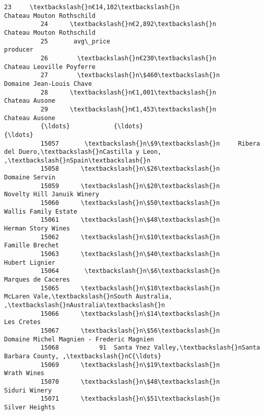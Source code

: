 \documentclass[11pt]{article}
\begin{document}
\begin{Verbatim}[commandchars=\\\{\}]
          23     \textbackslash{}n€14,102\textbackslash{}n                          Chateau Mouton Rothschild   
          24      \textbackslash{}n€2,892\textbackslash{}n                          Chateau Mouton Rothschild   
          25       avg\_price                                           producer   
          26        \textbackslash{}n€230\textbackslash{}n                          Chateau Leoville Poyferre   
          27        \textbackslash{}n\$460\textbackslash{}n                           Domaine Jean-Louis Chave   
          28      \textbackslash{}n€1,001\textbackslash{}n                                     Chateau Ausone   
          29      \textbackslash{}n€1,453\textbackslash{}n                                     Chateau Ausone   
          {\ldots}            {\ldots}                                                {\ldots}   
          15057       \textbackslash{}n\$9\textbackslash{}n     Ribera del Duero,\textbackslash{}nCastilla y Leon, ,\textbackslash{}nSpain\textbackslash{}n   
          15058      \textbackslash{}n\$26\textbackslash{}n                                     Domaine Servin   
          15059      \textbackslash{}n\$20\textbackslash{}n                         Novelty Hill Januik Winery   
          15060      \textbackslash{}n\$50\textbackslash{}n                               Wallis Family Estate   
          15061      \textbackslash{}n\$48\textbackslash{}n                                 Herman Story Wines   
          15062      \textbackslash{}n\$10\textbackslash{}n                                    Famille Brechet   
          15063      \textbackslash{}n\$40\textbackslash{}n                                     Hubert Lignier   
          15064       \textbackslash{}n\$6\textbackslash{}n                                 Marques de Caceres   
          15065      \textbackslash{}n\$10\textbackslash{}n     McLaren Vale,\textbackslash{}nSouth Australia, ,\textbackslash{}nAustralia\textbackslash{}n   
          15066      \textbackslash{}n\$14\textbackslash{}n                                         Les Cretes   
          15067      \textbackslash{}n\$56\textbackslash{}n          Domaine Michel Magnien - Frederic Magnien   
          15068           91  Santa Ynez Valley,\textbackslash{}nSanta Barbara County, ,\textbackslash{}nC{\ldots}   
          15069      \textbackslash{}n\$19\textbackslash{}n                                        Wrath Wines   
          15070      \textbackslash{}n\$48\textbackslash{}n                                      Siduri Winery   
          15071      \textbackslash{}n\$51\textbackslash{}n                                     Silver Heights   

\end{Verbatim}
\end{document}
